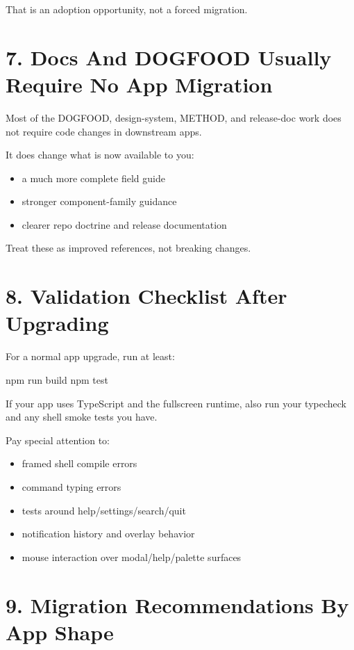 That is an adoption opportunity, not a forced migration.

\section{7. Docs And DOGFOOD Usually Require No App Migration}\label{record-264-docs-and-dogfood-usually-require-no-app-migration}

Most of the DOGFOOD, design-system, METHOD, and release-doc work does not require code changes in downstream apps.

It does change what is now available to you:

\begin{itemize}
\tightlist
\item
  a much more complete field guide
\item
  stronger component-family guidance
\item
  clearer repo doctrine and release documentation
\end{itemize}

Treat these as improved references, not breaking changes.

\section{8. Validation Checklist After Upgrading}\label{record-264-validation-checklist-after-upgrading}

For a normal app upgrade, run at least:

\begin{CodeBlock}
npm run build
npm test
\end{CodeBlock}

If your app uses TypeScript and the fullscreen runtime, also run your typecheck and any shell smoke tests you have.

Pay special attention to:

\begin{itemize}
\tightlist
\item
  framed shell compile errors
\item
  command typing errors
\item
  tests around help/settings/search/quit
\item
  notification history and overlay behavior
\item
  mouse interaction over modal/help/palette surfaces
\end{itemize}

\section{9. Migration Recommendations By App Shape}\label{record-264-migration-recommendations-by-app-shape}

